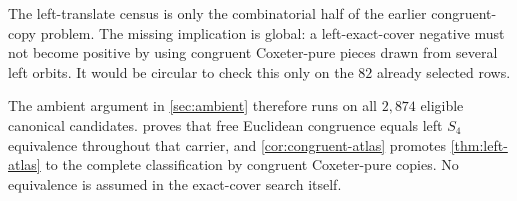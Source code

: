 The left-translate census is only the combinatorial half of the earlier
congruent-copy problem.  The missing implication is global: a
left-exact-cover negative must not become positive by using congruent
Coxeter-pure pieces drawn from several left orbits.  It would be circular to
check this only on the $82$ already selected rows.

The ambient argument in \cref{sec:ambient} therefore runs on all $2{,}874$
eligible canonical candidates.   proves that free
Euclidean congruence equals left $S_4$ equivalence throughout that carrier,
and \cref{cor:congruent-atlas} promotes \cref{thm:left-atlas} to the complete
classification by congruent Coxeter-pure copies.  No equivalence is assumed
in the exact-cover search itself.
